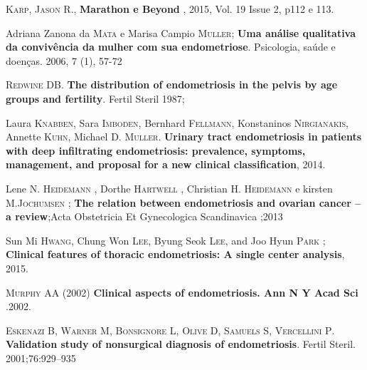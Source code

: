 \documentclass[12pt]{article} %
\begin{document}
\vspace{0,5cm}

\textsc{Karp, Jason R}., \textbf{Marathon e Beyond }, 2015, Vol. 19 Issue 2, p112 e 113.

\vspace{0,5cm}

Adriana Zanona da \textsc{Mata} e Marisa Campio \textsc{Muller};\textbf{ Uma análise qualitativa da convivência da mulher com sua endometriose}. Psicologia, saúde e doenças. 2006, 7 (1), 57-72

\vspace{0,5cm}

\textsc{Redwine DB}.\textbf{ The distribution of endometriosis in the pelvis by age groups and fertility}. Fertil Steril 1987; 

\vspace{0,5cm}

Laura \textsc{Knabben}, Sara \textsc{Imboden}, Bernhard \textsc{Fellmann}, Konstaninos \textsc{Nirgianakis}, Annette \textsc{Kuhn}, Michael D.\textsc{ Muller}. \textbf{Urinary tract endometriosis in patients with deep infiltrating endometriosis: prevalence, symptoms, management, and proposal for a new clinical classification}, 2014.

\vspace{0,5cm}

Lene N. \textsc{Heidemann} , Dorthe \textsc{Hartwell} , Christian H. \textsc{Heidemann} e kirsten M.\textsc{Jochumsen} ; \textbf{The relation between endometriosis and ovarian cancer – a review};Acta Obstetricia Et Gynecologica Scandinavica ;2013

\vspace{0,5cm}

Sun Mi\textsc{ Hwang}, Chung Won \textsc{Lee}, Byung Seok\textsc{ Lee}, and Joo Hyun \textsc{Park} ;\textbf{ Clinical features of thoracic endometriosis: A single center analysis}, 2015.

\vspace{0,5cm}

\textsc{Murphy AA} (2002) \textbf{Clinical aspects of endometriosis. Ann N Y Acad Sci} .2002.

\vspace{0,5cm}

\textsc{Eskenazi B, Warner M, Bonsignore L, Olive D, Samuels S, Vercellini P}. \textbf{Validation study of nonsurgical diagnosis of endometriosis}. Fertil Steril. 2001;76:929–935

\vspace{0,5cm}
\end{document}
